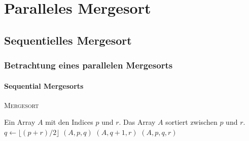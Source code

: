 \section{Paralleles Mergesort}

\subsection{Sequentielles Mergesort}
\begin{frame}
    \frametitle{Betrachtung eines parallelen Mergesorts}
    \framesubtitle{Sequential Mergesorts}
    \begin{algorithm}[H]
        \caption{{\rmfamily \textsc{Mergesort}} \cite[S.34]{cormen}}
        \label{alg:mergesort}
        \begin{algorithmic}[1]
            \Require Ein Array $A$ mit den Indices $p$ und $r$.
            \Ensure Das Array $A$ sortiert zwischen $p$ und $r$.
                \State $q \gets \lfloor (p + r) / 2 \rfloor$
                $(A, p, q)$
                $(A, q + 1, r)$
                $(A, p, q, r)$
            \EndIf
        \end{algorithmic}
    \end{algorithm}
\end{frame}

